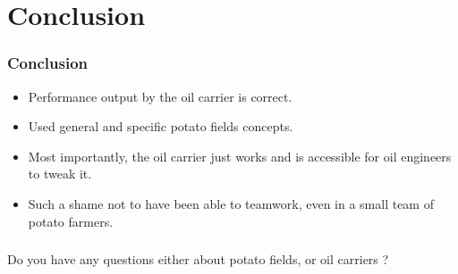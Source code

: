 \documentclass{beamer}
\begin{document}
\section{Conclusion}

	\begin{frame}
		\frametitle{Conclusion}
		\begin{itemize}
			\item Performance output by the oil carrier is correct.
			\item Used general and specific potato fields concepts. 
			\item Most importantly, the oil carrier just works and is accessible for oil engineers to tweak it.
			\item Such a shame not to have been able to teamwork, even in a small team of potato farmers.
		\end{itemize}
	\end{frame}

	\begin{frame}
		\frametitle{\null}
		Do you have any questions either about potato fields, or oil carriers ?
	\end{frame}
\end{document}

